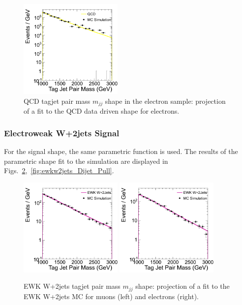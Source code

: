 \begin{figure}
\begin{center}
\includegraphics[width=0.45\textwidth]{figs/wpj/EWKW2jetstagjetmjj_QCD_electron_Model_12_Validate.png}
\end{center}
\caption{QCD tagjet pair mass $m_{jj}$ shape in the electron sample: projection of a fit to the QCD data driven shape for electrons.}
\label{fig:QCDFit_Dijet}
\end{figure}

\subsubsection{Electroweak W+2jets Signal}
For the signal shape, the same parametric function is used. The results of the parametric shape fit to the simulation are displayed in Figs.~\ref{fig:ewkw2jets_Dijet},~\ref{fig:ewkw2jets_Dijet_Pull}.

\begin{figure}
\begin{center}
\includegraphics[width=0.45\textwidth]{figs/wpj/EWKW2jetstagjetmjj_EWKW2jets_muon_Model_12_Validate.png}
\includegraphics[width=0.45\textwidth]{figs/wpj/EWKW2jetstagjetmjj_EWKW2jets_electron_Model_12_Validate.png}
\end{center}
\caption{\label{fig:topFit} EWK W+2jets tagjet pair mass $m_{jj}$ shape: projection of a fit to the EWK W+2jets MC for muons (left) and electrons (right).}
\label{fig:ewkw2jets_Dijet}
\end{figure}

